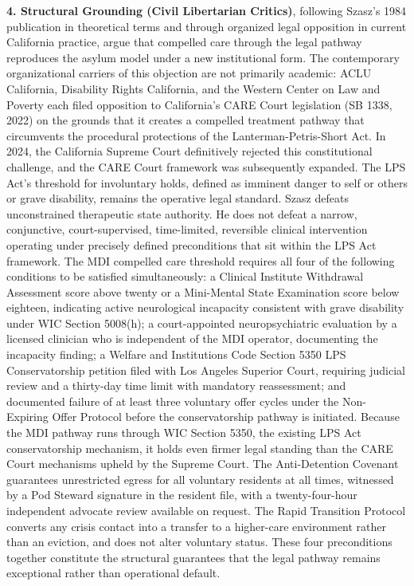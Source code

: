 \documentclass[12pt, letterpaper]{article}
\begin{document}
\textbf{4. Structural Grounding (Civil Libertarian Critics)}, following Szasz's 1984 publication in theoretical terms and through organized legal opposition in current California practice, argue that compelled care through the legal pathway reproduces the asylum model under a new institutional form. The contemporary organizational carriers of this objection are not primarily academic: ACLU California, Disability Rights California, and the Western Center on Law and Poverty each filed opposition to California's CARE Court legislation (SB 1338, 2022) on the grounds that it creates a compelled treatment pathway that circumvents the procedural protections of the Lanterman-Petris-Short Act. In 2024, the California Supreme Court definitively rejected this constitutional challenge, and the CARE Court framework was subsequently expanded. The LPS Act's threshold for involuntary holds, defined as imminent danger to self or others or grave disability, remains the operative legal standard. Szasz defeats unconstrained therapeutic state authority. He does not defeat a narrow, conjunctive, court-supervised, time-limited, reversible clinical intervention operating under precisely defined preconditions that sit within the LPS Act framework. The MDI compelled care threshold requires all four of the following conditions to be satisfied simultaneously: a Clinical Institute Withdrawal Assessment score above twenty or a Mini-Mental State Examination score below eighteen, indicating active neurological incapacity consistent with grave disability under WIC Section 5008(h); a court-appointed neuropsychiatric evaluation by a licensed clinician who is independent of the MDI operator, documenting the incapacity finding; a Welfare and Institutions Code Section 5350 LPS Conservatorship petition filed with Los Angeles Superior Court, requiring judicial review and a thirty-day time limit with mandatory reassessment; and documented failure of at least three voluntary offer cycles under the Non-Expiring Offer Protocol before the conservatorship pathway is initiated. Because the MDI pathway runs through WIC Section 5350, the existing LPS Act conservatorship mechanism, it holds even firmer legal standing than the CARE Court mechanisms upheld by the Supreme Court. The Anti-Detention Covenant guarantees unrestricted egress for all voluntary residents at all times, witnessed by a Pod Steward signature in the resident file, with a twenty-four-hour independent advocate review available on request. The Rapid Transition Protocol converts any crisis contact into a transfer to a higher-care environment rather than an eviction, and does not alter voluntary status. These four preconditions together constitute the structural guarantees that the legal pathway remains exceptional rather than operational default.
\end{document}
